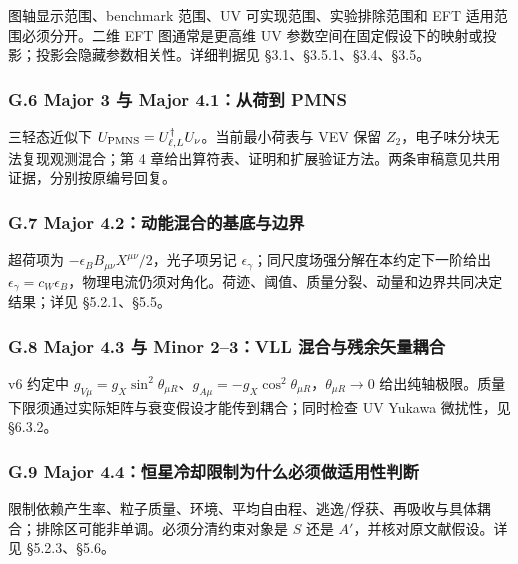 \documentclass[
]{article}
\begin{document}
图轴显示范围、benchmark 范围、UV 可实现范围、实验排除范围和 EFT
适用范围必须分开。二维 EFT 图通常是更高维 UV
参数空间在固定假设下的映射或投影；投影会隐藏参数相关性。详细判据见
§3.1、§3.5.1、§3.4、§3.5。

\subsubsection{G.6 Major 3 与 Major 4.1：从荷到
PMNS}\label{g.6-major-3-ux4e0e-major-4.1ux4eceux8377ux5230-pmns}

三轻态近似下 \(U_{\rm PMNS}=U_{\ell,L}^\dagger U_\nu\)。当前最小荷表与
VEV 保留 \(Z_2\)，电子味分块无法复现观测混合；第 4
章给出算符表、证明和扩展验证方法。两条审稿意见共用证据，分别按原编号回复。

\subsubsection{G.7 Major
4.2：动能混合的基底与边界}\label{g.7-major-4.2ux52a8ux80fdux6df7ux5408ux7684ux57faux5e95ux4e0eux8fb9ux754c}

超荷项为 \(-\epsilon_B B_{\mu\nu}X^{\mu\nu}/2\)，光子项另记
\(\epsilon_\gamma\)；同尺度场强分解在本约定下一阶给出
\(\epsilon_\gamma=c_W\epsilon_B\)，物理电流仍须对角化。荷迹、阈值、质量分裂、动量和边界共同决定结果；详见
§5.2.1、§5.5。

\subsubsection{G.8 Major 4.3 与 Minor 2--3：VLL
混合与残余矢量耦合}\label{g.8-major-4.3-ux4e0e-minor-23vll-ux6df7ux5408ux4e0eux6b8bux4f59ux77e2ux91cfux8026ux5408}

v6 约定中
\(g_{V\mu}=g_X\sin^2\theta_{\mu R}\)、\(g_{A\mu}=-g_X\cos^2\theta_{\mu R}\)，\(\theta_{\mu R}\to0\)
给出纯轴极限。质量下限须通过实际矩阵与衰变假设才能传到耦合；同时检查 UV
Yukawa 微扰性，见 §6.3.2。

\subsubsection{G.9 Major
4.4：恒星冷却限制为什么必须做适用性判断}\label{g.9-major-4.4ux6052ux661fux51b7ux5374ux9650ux5236ux4e3aux4ec0ux4e48ux5fc5ux987bux505aux9002ux7528ux6027ux5224ux65ad}

限制依赖产生率、粒子质量、环境、平均自由程、逃逸/俘获、再吸收与具体耦合；排除区可能非单调。必须分清约束对象是
\(S\) 还是 \(A'\)，并核对原文献假设。详见 §5.2.3、§5.6。
\end{document}
